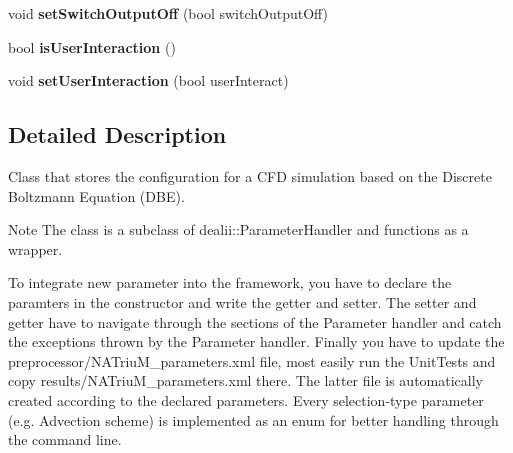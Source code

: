 \begin{DoxyCompactItemize}
\item 
\hypertarget{classnatrium_1_1SolverConfiguration_afcae7f43456c2a127c242b230ea3a8a2}{void {\bfseries set\-Switch\-Output\-Off} (bool switch\-Output\-Off)}\label{classnatrium_1_1SolverConfiguration_afcae7f43456c2a127c242b230ea3a8a2}

\item 
\hypertarget{classnatrium_1_1SolverConfiguration_a6e41f8ce5da4ecafe2e4326997e79f3d}{bool {\bfseries is\-User\-Interaction} ()}\label{classnatrium_1_1SolverConfiguration_a6e41f8ce5da4ecafe2e4326997e79f3d}

\item 
\hypertarget{classnatrium_1_1SolverConfiguration_ad013b9240ee7ae0d5cc43ff5f588c3f3}{void {\bfseries set\-User\-Interaction} (bool user\-Interact)}\label{classnatrium_1_1SolverConfiguration_ad013b9240ee7ae0d5cc43ff5f588c3f3}

\end{DoxyCompactItemize}


\subsection{Detailed Description}
Class that stores the configuration for a C\-F\-D simulation based on the Discrete Boltzmann Equation (D\-B\-E). 

\begin{DoxyNote}{Note}
The class is a subclass of dealii\-::\-Parameter\-Handler and functions as a wrapper. 

To integrate new parameter into the framework, you have to declare the paramters in the constructor and write the getter and setter. The setter and getter have to navigate through the sections of the Parameter handler and catch the exceptions thrown by the Parameter handler. Finally you have to update the preprocessor/\-N\-A\-Triu\-M\-\_\-parameters.\-xml file, most easily run the Unit\-Tests and copy results/\-N\-A\-Triu\-M\-\_\-parameters.\-xml there. The latter file is automatically created according to the declared parameters. Every selection-\/type parameter (e.\-g. Advection scheme) is implemented as an enum for better handling through the command line. 
\end{DoxyNote}


